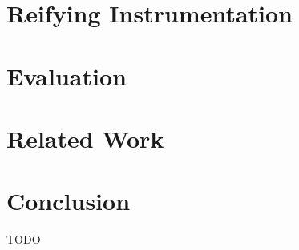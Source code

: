 \documentclass[letterpaper,twocolumn,10pt]{article}
\begin{document}




\section{Reifying Instrumentation}\label{sec:reify}



\section{Evaluation}\label{sec:eval}

\section{Related Work}\label{sec:related}

\section{Conclusion}\label{sec:conclusion}

TODO
\end{document}
